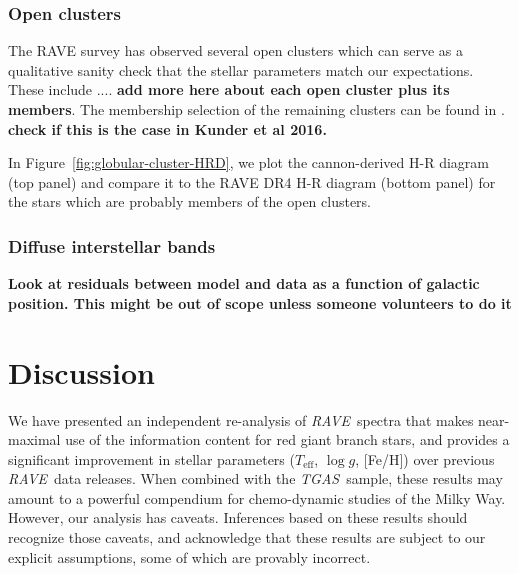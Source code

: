 \documentclass[preprint,trackchanges]{aastex}
\newcommand{\acronym}[1]{{\small{#1}}}
\newcommand{\project}[1]{\textsl{#1}}
\newcommand{\rave}{\project{\acronym{RAVE}}}
\newcommand{\tgas}{\project{\acronym{TGAS}}}
\newcommand{\stub}[1]{{\color{blue} \textbf{#1}}}
\newcommand{\teff}{T_{\mathrm{eff}}}
\newcommand{\logg}{\log g}
\begin{document}



\subsubsection{Open clusters}
\label{sec:open-cluster-validation}
The RAVE survey has observed several open clusters which can serve as a qualitative sanity check that the stellar parameters match our expectations. These include .... \stub{add more here about each open cluster plus its members}. The membership selection of the remaining clusters can be found in \cite{Kunder_2016}. \stub{check if this is the case in Kunder et al 2016.} 

 In Figure~\ref{fig:globular-cluster-HRD}, we plot the cannon-derived H-R diagram (top panel) and compare it to the RAVE DR4 H-R diagram (bottom panel) for the stars which are probably members of the open clusters. 

\subsubsection{Diffuse interstellar bands}
\label{sec:dibs-validation}

\stub{Look at residuals between model and data as a function of galactic position. This might be out of scope unless someone volunteers to do it}


\section{Discussion}
\label{sec:discussion}


We have presented an independent re-analysis of \rave\ spectra that makes near-maximal
use of the information content for red giant branch stars, and provides a significant
improvement in stellar parameters ($\teff$, $\logg$, [Fe/H]) over previous \rave\ data
releases.  When combined with the \tgas\ sample, these results may amount to a powerful
compendium for chemo-dynamic studies of the Milky Way.  However, our analysis has caveats.
Inferences based on these results should recognize those caveats, and acknowledge that 
these results are subject to our explicit assumptions, some of which are provably
incorrect.
\end{document}
